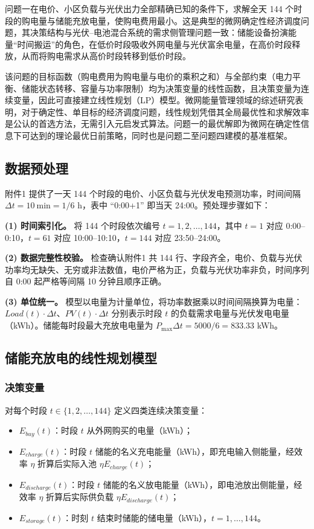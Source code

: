\documentclass[zihao=-4,a4paper,UTF8,fontset=none]{ctexart}
\begin{document}
问题一在电价、小区负载与光伏出力全部精确已知的条件下，求解全天 144 个时段的购电量与储能充放电量，使购电费用最小。这是典型的微网确定性经济调度问题，其决策结构与光伏--电池混合系统的需求侧管理问题一致\cite{wu2015demand}：储能设备扮演能量“时间搬运”的角色，在低价时段吸收外网电量与光伏富余电量，在高价时段释放，从而将购电需求从高价时段转移到低价时段。

该问题的目标函数（购电费用为购电量与电价的乘积之和）与全部约束（电力平衡、储能状态转移、容量与功率限制）均为决策变量的线性函数，且决策变量为连续变量，因此可直接建立线性规划（LP）模型。微网能量管理领域的综述研究表明，对于确定性、单目标的经济调度问题，线性规划凭借其全局最优性和求解效率是公认的首选方法\cite{zia2018microgrids}，无需引入元启发式算法。问题一的最优解即为微网在确定性信息下可达到的理论最优日前策略，同时也是问题二至问题四建模的基准框架。

\subsection{数据预处理}

附件1 提供了一天 144 个时段的电价、小区负载与光伏发电预测功率，时间间隔 $\Delta t = 10\ \mathrm{min} = 1/6$ h，表中 ``0:00+1'' 即当天 24:00。预处理步骤如下：

\textbf{(1) 时间索引化。} 将 144 个时段依次编号 $t = 1,2,\ldots,144$，其中 $t=1$ 对应 0:00--0:10，$t=61$ 对应 10:00--10:10，$t=144$ 对应 23:50--24:00。

\textbf{(2) 数据完整性校验。} 检查确认附件1 共 144 行、字段齐全，电价、负载与光伏功率均无缺失、无穷或非法数值，电价严格为正，负载与光伏功率非负，时间序列自 0:00 起严格等间隔 10 分钟且顺序正确。

\textbf{(3) 单位统一。} 模型以电量为计量单位，将功率数据乘以时间间隔换算为电量：$Load(t)\cdot\Delta t$、$PV(t)\cdot\Delta t$ 分别表示时段 $t$ 的负载需求电量与光伏发电电量（kWh）。储能每时段最大充放电电量为 $P_{\max}\Delta t = 5000/6 = 833.33$ kWh。

\subsection{储能充放电的线性规划模型}

\subsubsection{决策变量}

对每个时段 $t\in\{1,2,\ldots,144\}$ 定义四类连续决策变量：

\begin{itemize}
  \item $E_{buy}(t)$：时段 $t$ 从外网购买的电量（kWh）；
  \item $E_{charge}(t)$：时段 $t$ 储能的名义充电能量（kWh），即充电输入侧能量，经效率 $\eta$ 折算后实际入池 $\eta E_{charge}(t)$；
  \item $E_{discharge}(t)$：时段 $t$ 储能的名义放电能量（kWh），即电池放出侧能量，经效率 $\eta$ 折算后实际供负载 $\eta E_{discharge}(t)$；
  \item $E_{storage}(t)$：时刻 $t$ 结束时储能的储电量（kWh），$t=1,\ldots,144$。
\end{itemize}
\end{document}
